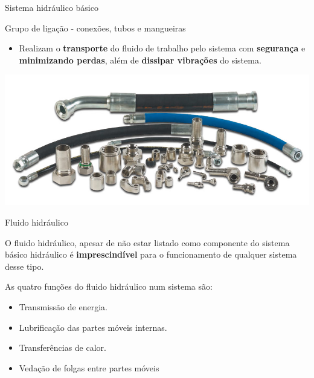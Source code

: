\begin{frame}{Sistema hidráulico básico}
	\begin{block}{Grupo de ligação - conexões, tubos e mangueiras}
		\begin{itemize}
			\item Realizam o \textbf{transporte} do fluido de trabalho pelo sistema com \textbf{segurança} e \textbf{minimizando perdas}, além de \textbf{dissipar vibrações} do sistema.
		\end{itemize}
	\end{block}
	
	\medskip
	
	\centering
	\includegraphics[width=0.9\linewidth]{Figuras/Ch15/fig12}
	
\end{frame}


\begin{frame}{Fluido hidráulico}
	\begin{block}{}
		O fluido hidráulico, apesar de não estar listado como componente do sistema básico hidráulico é \textbf{imprescindível} para o funcionamento de qualquer sistema desse tipo.
		
		\smallskip
		
		As quatro funções do fluido hidráulico num sistema são:
		\begin{itemize}
			\item Transmissão de energia.
			\item Lubrificação das partes móveis internas.
			\item Transferências de calor.
			\item Vedação de folgas entre partes móveis
		\end{itemize}
	\end{block}
\end{frame}


